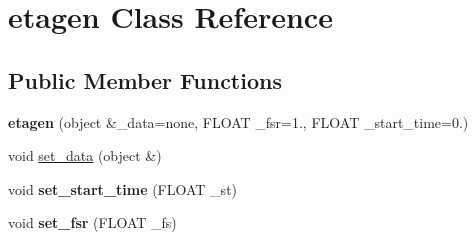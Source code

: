 \hypertarget{classetagen}{\section{etagen Class Reference}
\label{classetagen}
}
\subsection*{Public Member Functions}
\begin{DoxyCompactItemize}
\item 
\hypertarget{classetagen_aa580c99c23b6d9ad47e7f77838c319c4}{{\bfseries etagen} (object \&\-\_\-data=none, F\-L\-O\-A\-T \-\_\-fsr=1., F\-L\-O\-A\-T \-\_\-start\-\_\-time=0.)}\label{classetagen_aa580c99c23b6d9ad47e7f77838c319c4}

\item 
void \hyperlink{classetagen_a96e7264ed9cf4f4f238fc2b645920586}{set\-\_\-data} (object \&)
\item 
\hypertarget{classetagen_a49f2c29605674eadb7f2b3c74ba6b2a8}{void {\bfseries set\-\_\-start\-\_\-time} (F\-L\-O\-A\-T \-\_\-st)}\label{classetagen_a49f2c29605674eadb7f2b3c74ba6b2a8}

\item 
\hypertarget{classetagen_aeed11ff7ed469485168426f823feb7f8}{void {\bfseries set\-\_\-fsr} (F\-L\-O\-A\-T \-\_\-fs)}\label{classetagen_aeed11ff7ed469485168426f823feb7f8}


\end{DoxyCompactItemize}
